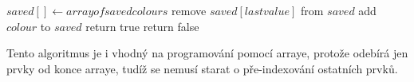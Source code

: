 \documentclass{../../../ksp}
\begin{document}
\begin{algorithm*}
    \begin{algorithmic}
        \State $saved[] \gets array of saved colours$
                \State remove $saved[last value]$ from $saved$
            \Else
                \State add $colour$ to $saved$
            \EndIf
        \EndFor
            \State return true
        \Else
            \State return false
        \EndIf
    \end{algorithmic}
\end{algorithm*}

Tento algoritmus je i vhodný na programování pomocí arraye, protože odebírá jen prvky od konce arraye,
tudíž se nemusí starat o pře-indexování ostatních prvků.
\end{document}
